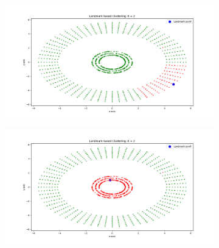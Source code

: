 \documentclass[a4paper,11pt]{article}
\begin{document}
\begin{mlsolution}
\begin{figure}[!htbp]
\begin{subfigure}{0.5\textwidth}
		\caption{}
		\label{l8}
	\end{subfigure}
\\
	\begin{subfigure}{0.5\textwidth}
		\centering
		\includegraphics[width=1.1\textwidth]{images/l_random9.png}
		\caption{}
		\label{l9}
	\end{subfigure}
	\begin{subfigure}{0.5\textwidth}
		\centering
		\includegraphics[width=1.1\textwidth]{images/l_random10.png}
		\caption{}
		\label{l10}
	\end{subfigure}
\end{figure}
\end{mlsolution}
\end{document}
